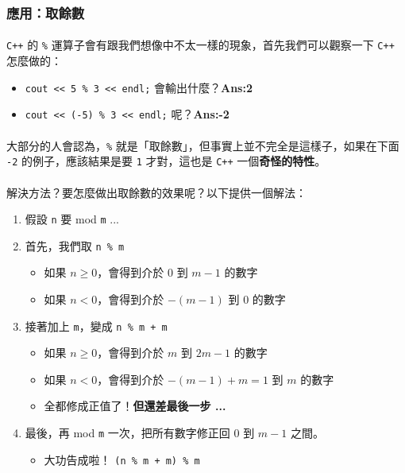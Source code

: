 \documentclass[12pt,a4paper,oneside]{article}
\begin{document}
\begin{CJK}{UTF8}{bkai}
\subsubsection{應用：取餘數}

\paragraph{}\texttt{C++} 的 \lstinline!%! 運算子會有跟我們想像中不太一樣的現象，首先我們可以觀察一下 \texttt{C++} 怎麼做的：
\begin{itemize}
\item \lstinline!cout << 5 % 3 << endl;! 會輸出什麼？{\textbf{Ans:2}}
\item \lstinline!cout << (-5) % 3 << endl;! 呢？{\textbf{Ans:-2}}
\end{itemize}

\paragraph{}大部分的人會認為，\lstinline!%! 就是「取餘數」，但事實上並不完全是這樣子，如果在下面 \lstinline!-2! 的例子，應該結果是要 \lstinline!1! 才對，這也是 \texttt{C++} 一個\textbf{奇怪的特性}。

\paragraph{}解決方法？要怎麼做出取餘數的效果呢？以下提供一個解法：
  
\begin{enumerate}
\item 假設 \lstinline!n! 要 mod \lstinline!m! ...
\item 首先，我們取 \lstinline!n % m!
  \begin{itemize}
  \item 如果 $n\geq{0}${，會得到介於 $0$ 到 $m-1$ 的數字}
  \item 如果 $n<0${，會得到介於 $-(m-1)$ 到 $0$ 的數字}
  \end{itemize}
\item 接著加上 \lstinline!m!，變成 \lstinline!n % m + m!
  \begin{itemize}
  \item 如果 $n\geq{0}${，會得到介於 $m$ 到 $2m-1$ 的數字}
  \item 如果 $n<0${，會得到介於 $-(m-1)+m=1$ 到 $m$ 的數字}
  \item 全都修成正值了！{\textbf{但還差最後一步 ...}}
  \end{itemize}
\item 最後，再 mod \lstinline!m! 一次，把所有數字修正回 $0$ 到 $m-1$ 之間。
  \begin{itemize}
  \item 大功告成啦！ \lstinline!(n % m + m) % m!
  \end{itemize}
\end{enumerate}


\end{CJK}
\end{document}
